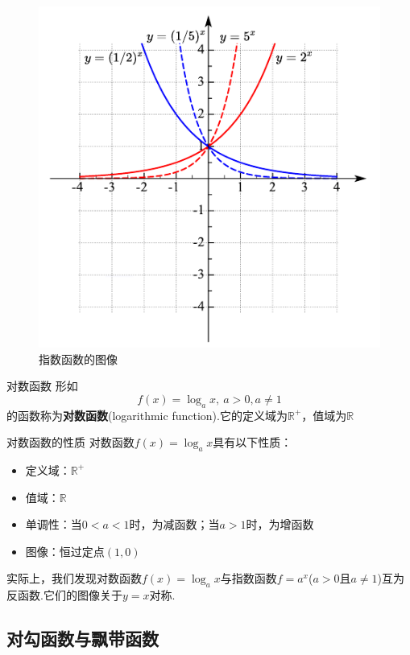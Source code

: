 \documentclass[lang=cn, zihao=5]{elegantbook}
\begin{document}
\begin{figure}[h!]
	\centering
	\includegraphics{attachment/20230402viuuhjuu.pdf}
	\caption{指数函数的图像}
\end{figure}

\begin{definition}{对数函数}
    形如$$f(x)=\log_{a}{x}, \ a>0,a \neq 1$$
    的函数称为\textbf{对数函数}(logarithmic function).它的定义域为$\mathbb{R}^{+}$，值域为$\mathbb{R}$
\end{definition}

\begin{proposition}{对数函数的性质}
    对数函数$f(x)=\log_{a}{x}$具有以下性质：
    \begin{itemize}
        \item 定义域：$\mathbb{R}^{+}$
        \item 值域：$\mathbb{R}$
        \item 单调性：当$0<a<1$时，为减函数；当$a>1$时，为增函数
        \item 图像：恒过定点$(1,0)$
    \end{itemize}
\end{proposition}


实际上，我们发现对数函数$f(x)=\log_{a}{x}$与指数函数$f=a^{x}$($a>0$且$a \neq 1$)互为反函数.它们的图像关于$y=x$对称.

\subsection{对勾函数与飘带函数}
\end{document}
